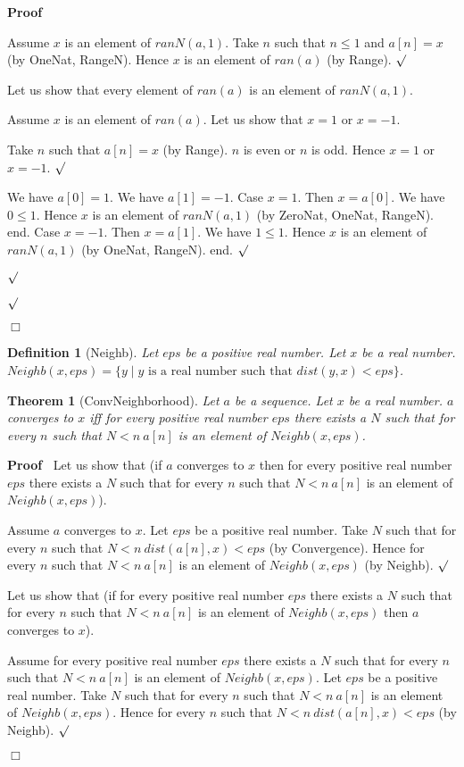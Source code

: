\documentclass{article}
\newenvironment{forthel}{\begin{leftbar}}{\end{leftbar}}
\newenvironment{proof}{\noindent\textbf{Proof\ }}{\hspace*{\fill}$\Box$\medskip}
\newenvironment{subproof}{\begin{list}{}{}
		\item[\text{Proof}]}{\hfill $\surd$ \end{list}}
\newtheorem{theorem}{Theorem}
\newtheorem{definition}{Definition}
\begin{document}
\begin{forthel}
\begin{proof}
\begin{subproof}
\begin{subproof}
	\begin{subproof}
	Assume $x$ is an element of $ranN(a,1)$.
	Take $n$ such that $n \leq 1$ and $a[n] = x$ (by OneNat, RangeN).
	Hence $x$ is an element of $ran(a)$ (by Range).
	\end{subproof}
	Let us show that every element of $ran(a)$ is an element of $ranN(a,1)$.
	\begin{subproof}
	Assume $x$ is an element of $ran(a)$.
	Let us show that $x = 1$ or $x = -1$.
	\begin{subproof}
	Take $n$ such that $a[n] = x$ (by Range).
	$n$ is even or $n$ is odd.
	Hence $x = 1$ or $x = -1$.
	\end{subproof}
	We have $a[0] = 1$.
	We have $a[1] = -1$.
	Case $x = 1$.
	Then $x = a[0]$.
	We have $0 \leq 1$.
	Hence $x$ is an element of $ranN(a,1)$ (by ZeroNat, OneNat, RangeN).
	end.
	Case $x = -1$.
	Then $x = a[1]$. 
	We have $1 \leq 1$.
	Hence $x$ is an element of $ranN(a,1)$ (by OneNat, RangeN).
	end.
	\end{subproof}
	\end{subproof}
	\end{subproof}
	\end{proof}
	
	\begin{definition}[Neighb]
	Let $eps$ be a positive real number. Let $x$ be a real number.
	$Neighb(x,eps) = \{y \mid y \text{ is a real number such that } dist(y,x) < eps\}$.
	\end{definition}
	
	\begin{theorem}[ConvNeighborhood]
	Let $a$ be a sequence. Let $x$ be a real number.
	$a$ converges to $x$ iff for every positive real number $eps$ there exists a $N$
	such that for every $n$ such that $N < n \ a[n]$ is an element of $Neighb(x,eps)$.
	\end{theorem}
	\begin{proof}
	Let us show that (if $a$ converges to $x$ then for every positive real number $eps$ there exists a $N$
	such that for every $n$ such that $N < n \ a[n]$ is an element of $Neighb(x,eps)$).
	\begin{subproof}
	Assume $a$ converges to $x$.
	Let $eps$ be a positive real number.
	Take $N$ such that for every $n$ such that $N < n \ dist(a[n],x) < eps$ (by Convergence).
	Hence for every $n$ such that $N < n \ a[n]$ is an element of $Neighb(x,eps)$ (by Neighb).
	\end{subproof}
	Let us show that (if for every positive real number $eps$ there exists a $N$ such that
	for every $n$ such that $N < n \ a[n]$ is an element of $Neighb(x,eps)$ then $a$ converges to $x$).
	\begin{subproof}
	Assume for every positive real number $eps$ there exists a $N$ such that
	for every $n$ such that $N < n \ a[n]$ is an element of $Neighb(x,eps)$.
	Let $eps$ be a positive real number.
	Take $N$ such that for every $n$ such that $N < n \ a[n]$ is an element of $Neighb(x,eps)$.
	Hence for every $n$ such that $N < n \ dist(a[n],x) < eps$ (by Neighb).
	\end{subproof}
	\end{proof}	
	

\end{forthel}
\end{document}
